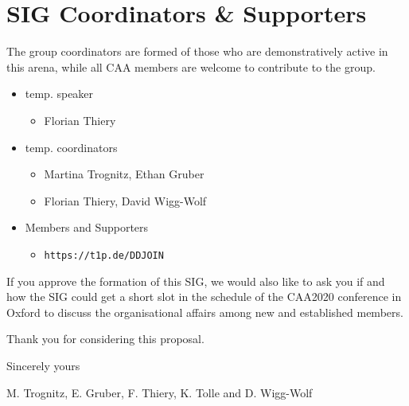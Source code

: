 \documentclass[a4paper]{article}
\begin{document}
\section{SIG Coordinators \& Supporters}\label{sig-coordinators-supporters}

The group coordinators are formed of those who are demonstratively active in this arena, while all CAA members are welcome to contribute to the group.

\begin{itemize}
	\item temp. speaker
	\begin{itemize}
		\item Florian Thiery
	\end{itemize}
	\item temp. coordinators
	\begin{itemize}
		\item Martina Trognitz, Ethan Gruber
		\item Florian Thiery, David Wigg-Wolf
	\end{itemize}
	\item Members and Supporters
	\begin{itemize}
		\item \texttt{https://t1p.de/DDJOIN}
	\end{itemize}
\end{itemize}


If you approve the formation of this SIG, we would also like to ask you if and how the SIG could get a short slot in the schedule of the CAA2020 conference in Oxford to discuss the organisational affairs among new and established members.
\newline


Thank you for considering this proposal.
\newline


Sincerely yours
\newline


M. Trognitz, E. Gruber, F. Thiery, K. Tolle and D. Wigg-Wolf
\end{document}
